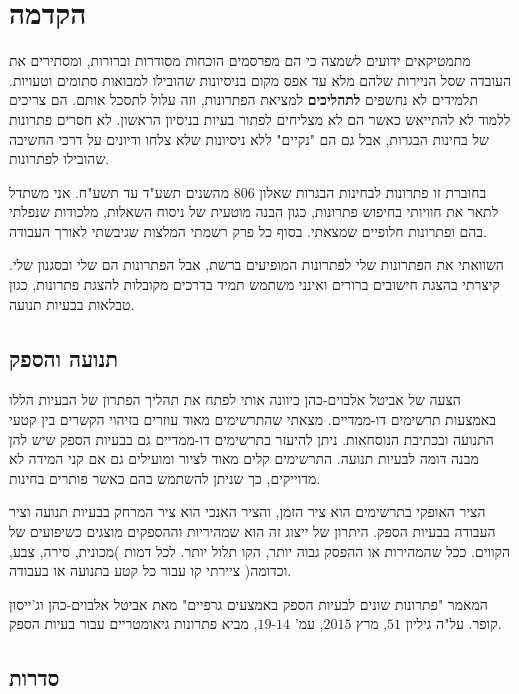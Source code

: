\cleardoublepage
{}

\section*{הקדמה}

מתמטיקאים ידועים לשמצה כי הם מפרסמים הוכחות מסודרות וברורות, ומסתירים את העובדה שסל הניירות שלהם מלא עד אפס מקום בניסיונות שהובילו למבואות סתומים וטעויות. תלמידים לא נחשפים
\textbf{לתהליכים}
למציאת הפתרונות, וזה עלול לתסכל אותם. הם צריכים ללמוד לא להתייאש כאשר הם לא מצליחים לפתור בעיות בניסיון הראשון. לא חסרים פתרונות של בחינות הבגרות, אבל גם הם "נקיים" ללא ניסיונות שלא צלחו ודיונים על דרכי החשיבה שהובילו לפתרונות.

בחוברת זו פתרונות לבחינות הבגרות שאלון
$806$
מהשנים תשע"ד עד תשע"ח. אני משתדל לתאר את חוויותי בחיפוש פתרונות, כגון הבנה מוטעית של ניסוח השאלות, מלכודות שנפלתי בהם ופתרונות חלופיים שמצאתי. בסוף כל פרק רשמתי המלצות שגיבשתי לאורך העבודה.

השוואתי את הפתרונות שלי לפתרונות המופיעים ברשת, אבל הפתרונות הם שלי ובסגנון שלי. קיצרתי בהצגת חישובים ברורים ואינני משתמש תמיד בדרכים מקובלות להצגת פתרונות, כגון טבלאות בבעיות תנועה.

\subsection*{תנועה והספק}

הצעה של אביטל אלבוים-כהן כיוונה אותי לפתח את תהליך הפתרון של הבעיות הללו באמצעות תרשימים דו-ממדיים. מצאתי שהתרשימים מאוד עוזרים בזיהוי הקשרים בין קטעי התנועה ובכתיבת הנוסחאות. ניתן להיעזר בתרשימים דו-ממדיים גם בבעיות הספק שיש להן מבנה דומה לבעיות תנועה. התרשימים קלים מאוד לציור ומועילים גם אם קני המידה לא מדוייקים, כך שניתן להשתמש בהם כאשר פותרים בחינות.


הציר האופקי בתרשימים הוא ציר הזמן, והציר האנכי הוא ציר המרחק בבעיות תנועה וציר העבודה בבעיות הספק. היתרון של ייצוג זה הוא שמהיריות וההספקים מוצגים כשיפועים של הקווים. ככל שהמהירות או ההפסק גבוה יותר, הקו תלול יותר. לכל דמות )מכונית, סירה, צבע, וכדומה( ציירתי קו עבור כל קטע בתנועה או בעבודה.

המאמר "פתרונות שונים לבעיות הספק באמצעים גרפיים" מאת אביטל אלבוים-כהן וג'ייסון קופר. על"ה גיליון
$51$,
מרץ
$2015$,
עמ'
$14$-$19$,
מביא פתרונות גיאומטריים עבור בעיות הספק.

\subsection*{סדרות}

